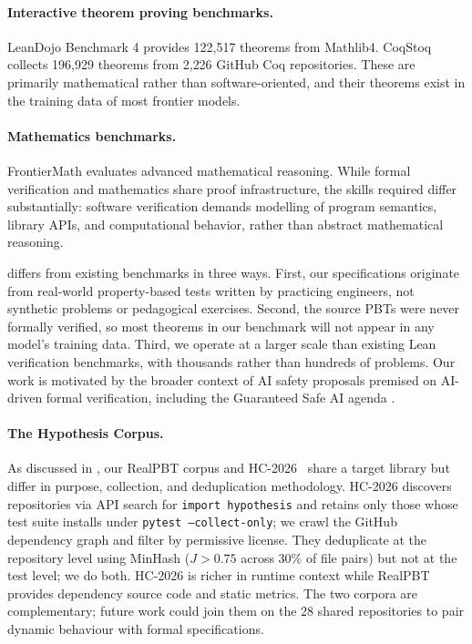 \paragraph{Interactive theorem proving benchmarks.}
LeanDojo Benchmark 4 \cite{hsiang2025leandojo} provides 122{,}517 theorems from Mathlib4. CoqStoq \cite{thompson2024rango} collects 196{,}929 theorems from 2{,}226 GitHub Coq repositories. These are primarily mathematical rather than software-oriented, and their theorems exist in the training data of most frontier models.

\paragraph{Mathematics benchmarks.}
FrontierMath \cite{glazer2024frontiermath} evaluates advanced mathematical reasoning. While formal verification and mathematics share proof infrastructure, the skills required differ substantially: software verification demands modelling of program semantics, library APIs, and computational behavior, rather than abstract mathematical reasoning.

\FVSpec differs from existing benchmarks in three ways. First, our specifications originate from real-world property-based tests written by practicing engineers, not synthetic problems or pedagogical exercises. Second, the source PBTs were never formally verified, so most theorems in our benchmark will not appear in any model's training data. Third, we operate at a larger scale than existing Lean verification benchmarks, with thousands rather than hundreds of problems. Our work is motivated by the broader context of AI safety proposals premised on AI-driven formal verification, including the Guaranteed Safe AI agenda \cite{dalrymple2024guaranteed}.

\paragraph{The Hypothesis Corpus.}
As discussed in , our RealPBT corpus and HC-2026~\cite{devoe2026hypothesis} share a target library but differ in purpose, collection, and deduplication methodology.
HC-2026 discovers repositories via API search for \texttt{import hypothesis} and retains only those whose test suite installs under \texttt{pytest --collect-only}; we crawl the GitHub dependency graph and filter by permissive license.
They deduplicate at the repository level using MinHash ($J{>}0.75$ across 30\% of file pairs) but not at the test level; we do both.
HC-2026 is richer in runtime context while RealPBT provides dependency source code and static metrics.
The two corpora are complementary; future work could join them on the 28 shared repositories to pair dynamic behaviour with formal specifications.